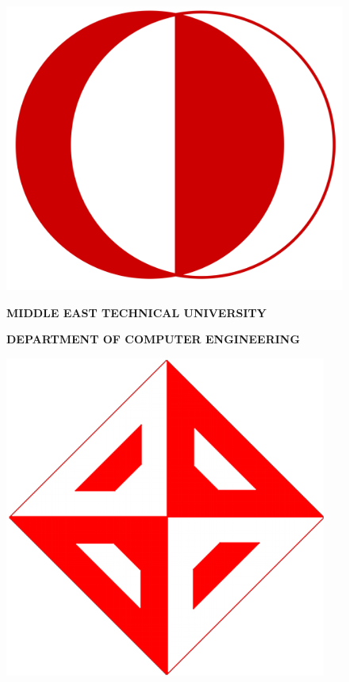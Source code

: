 \begin{titlepage}
  \begin{center}

  \begin{figure}[ht]
    \begin{minipage}[l]{.09\textwidth}
      \includegraphics[width=\linewidth]{img/metu-logo.png}
    \end{minipage}
    \begin{minipage}[c]{.8\textwidth}
      \centering
      \large{
        \textbf{MIDDLE EAST TECHNICAL UNIVERSITY}
      }

      \normalsize{
        \textbf{DEPARTMENT OF COMPUTER ENGINEERING}
      }
    \end{minipage}
    \begin{minipage}[r]{.09\textwidth}
      \includegraphics[width=\linewidth]{img/metu-ceng-logo.png}
    \end{minipage}
  \end{figure}
  

\end{center}
\end{titlepage}
